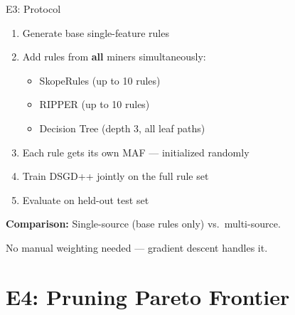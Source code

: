 \documentclass[aspectratio=169,12pt]{beamer}
\begin{document}
\begin{frame}{E3: Protocol}

\begin{enumerate}
    \item Generate base single-feature rules

    \vspace{0.5em}
    \item Add rules from \textbf{all} miners simultaneously:
    \begin{itemize}
        \item SkopeRules (up to 10 rules)
        \item RIPPER (up to 10 rules)
        \item Decision Tree (depth 3, all leaf paths)
    \end{itemize}

    \vspace{0.5em}
    \item Each rule gets its own MAF --- initialized randomly

    \vspace{0.5em}
    \item Train DSGD++ jointly on the full rule set

    \vspace{0.5em}
    \item Evaluate on held-out test set
\end{enumerate}

\vspace{1em}
\textbf{Comparison:} Single-source (base rules only) vs.\ multi-source.

\vspace{0.5em}
No manual weighting needed --- gradient descent handles it.

\end{frame}


\section{E4: Pruning Pareto Frontier}
\end{document}
